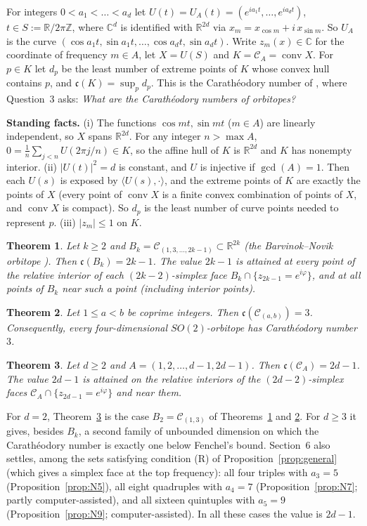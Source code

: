 \documentclass[11pt]{amsart}
\newtheorem{theorem}{Theorem}
\theoremstyle{remark}
\newcommand{\R}{\mathbb{R}}
\newcommand{\C}{\mathbb{C}}
\newcommand{\Z}{\mathbb{Z}}
\newcommand{\cc}{\mathfrak{c}}
\newcommand{\conv}{\operatorname{conv}}
\begin{document}
For integers $0<a_1<\dots<a_d$ let $U(t)=U_A(t)=(e^{ia_1t},\dots,e^{ia_dt})$, $t\in S:=\R/2\pi\Z$, where $\C^d$ is identified with
$\R^{2d}$ via $x_m=x_{\cos m}+i\,x_{\sin m}$. So $U_A$ is the curve $(\cos a_1t,\sin a_1t,\dots,\cos a_dt,\sin a_dt)$. Write $z_m(x)\in\C$ for the coordinate
of frequency $m\in A$, let $X=U(S)$ and $K=\mathcal C_A=\conv X$. For $p\in K$ let $d_p$ be the least number of extreme points of $K$ whose convex hull contains $p$,
and $\cc(K)=\sup_pd_p$. This is the Carath\'eodory number of \cite[\S2.1]{SSS}, where Question~3 asks: \emph{What are the Carath\'eodory numbers of orbitopes?}

\smallskip\noindent\textbf{Standing facts.} (i) The functions $\cos mt,\sin mt$ ($m\in A$) are linearly independent, so $X$ spans $\R^{2d}$. For any integer
$n>\max A$, $0=\frac1n\sum_{j<n}U(2\pi j/n)\in K$, so the affine hull of $K$ is $\R^{2d}$ and $K$ has nonempty interior. (ii) $|U(t)|^2=d$ is constant, and $U$ is injective if $\gcd(A)=1$. Then each $U(s)$ is exposed by $\langle U(s),\cdot\rangle$, and
the extreme points of $K$ are exactly the points of $X$ (every point of $\conv X$ is a finite convex combination of points of $X$, and $\conv X$ is compact).
So $d_p$ is the least number of curve points needed to represent $p$. (iii) $|z_m|\le1$ on $K$.

\begin{theorem}\label{thm:A}
Let $k\ge2$ and $B_k=\mathcal C_{(1,3,\dots,2k-1)}\subset\R^{2k}$ (the Barvinok--Novik orbitope \cite{BN08}). Then $\cc(B_k)=2k-1$. The value
$2k-1$ is attained at every point of the relative interior of each $(2k-2)$-simplex face $B_k\cap\{z_{2k-1}=e^{i\varphi}\}$, and at all points of $B_k$ near
such a point (including interior points).
\end{theorem}

\begin{theorem}\label{thm:B}
Let $1\le a<b$ be coprime integers. Then $\cc(\mathcal C_{(a,b)})=3$. Consequently, every four-dimensional $SO(2)$-orbitope has Carath\'eodory number $3$.
\end{theorem}

\begin{theorem}\label{thm:C}
Let $d\ge2$ and $A=(1,2,\dots,d-1,2d-1)$. Then $\cc(\mathcal C_A)=2d-1$. The value $2d-1$ is attained on the relative interiors of the $(2d-2)$-simplex faces
$\mathcal C_A\cap\{z_{2d-1}=e^{i\varphi}\}$ and near them.
\end{theorem}
\noindent For $d=2$, Theorem~\ref{thm:C} is the case $B_2=\mathcal C_{(1,3)}$ of Theorems~\ref{thm:A} and \ref{thm:B}. For $d\ge3$ it gives, besides $B_k$, a second family of unbounded dimension on which
the Carath\'eodory number is exactly one below Fenchel's bound. Section~6 also settles, among the sets satisfying condition (R) of
Proposition~\ref{prop:general} (which gives a simplex face at the top frequency): all four triples with $a_3=5$ (Proposition~\ref{prop:N5}), all
eight quadruples with $a_4=7$ (Proposition~\ref{prop:N7}; partly computer-assisted), and all sixteen quintuples with $a_5=9$ (Proposition~\ref{prop:N9};
computer-assisted). In all these cases the value is $2d-1$.
\end{document}
